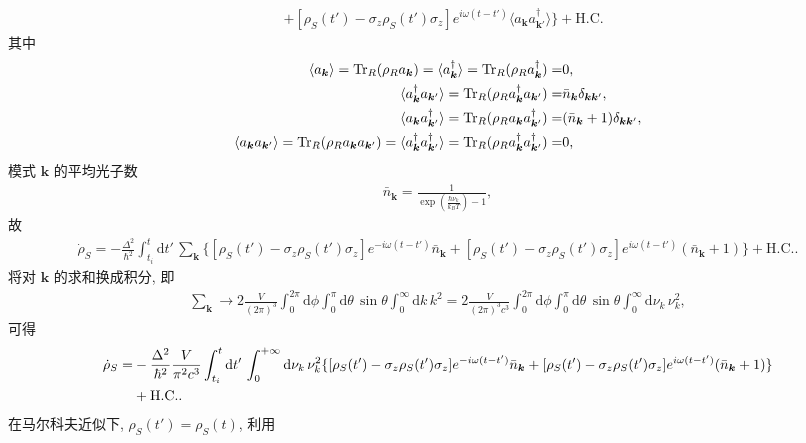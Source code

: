 \documentclass{assignment}
\begin{document}
\begin{sol}
\begin{align}
        &+[\rho_S(t')-\sigma_z\rho_S(t')\sigma_z]e^{i\omega(t-t')}\langle a_{\bm{k}}a_{\bm{k}'}^{\dagger}\rangle\}+\text{H.C.}
    \end{align}
    其中
    \begin{align}
        \langle a_{\bm{k}}\rangle=\operatorname{Tr}_R(\rho_Ra_{\bm{k}})=\langle a_{\bm{k}}^{\dagger}\rangle=\operatorname{Tr}_R(\rho_Ra_{\bm{k}}^{\dagger})=&0,\\
        \langle a_{\bm{k}}^{\dagger}a_{\bm{k}'}\rangle=\operatorname{Tr}_R(\rho_Ra_{\bm{k}}^{\dagger}a_{\bm{k}'})=&\bar{n}_{\bm{k}}\delta_{\bm{kk}'},\\
        \langle a_{\bm{k}}a_{\bm{k}'}^{\dagger}\rangle=\operatorname{Tr}_R(\rho_Ra_{\bm{k}}a_{\bm{k}'}^{\dagger})=&(\bar{n}_{\bm{k}}+1)\delta_{\bm{kk}'},\\
        \langle a_{\bm{k}}a_{\bm{k}'}\rangle=\operatorname{Tr}_R(\rho_Ra_{\bm{k}}a_{\bm{k}'})=\langle a_{\bm{k}}^{\dagger}a_{\bm{k}'}^{\dagger}\rangle=\operatorname{Tr}_R(\rho_Ra_{\bm{k}}^{\dagger}a_{\bm{k}'}^{\dagger})=&0,
    \end{align}
    模式 $\bm{k}$ 的平均光子数
    \begin{align}
        \bar{n}_{\bm{k}}=\frac{1}{\exp\left(\frac{\hbar\nu_k}{k_BT}\right)-1},
    \end{align}
    故
    \begin{align}
        \dot{\rho}_S=-\frac{\Delta^2}{\hbar^2}\int_{t_i}^t\mathrm{d}t'\,\sum_{\bm{k}}\{[\rho_S(t')-\sigma_z\rho_S(t')\sigma_z]e^{-i\omega(t-t')}\bar{n}_{\bm{k}}+[\rho_S(t')-\sigma_z\rho_S(t')\sigma_z]e^{i\omega(t-t')}(\bar{n}_{\bm{k}}+1)\}+\text{H.C.}.
    \end{align}
    将对 $\bm{k}$ 的求和换成积分, 即
    \begin{align}
        \sum_{\bm{k}}\rightarrow 2\frac{V}{(2\pi)^3}\int_0^{2\pi}\mathrm{d}\phi\int_0^{\pi}\mathrm{d}\theta\,\sin\theta\int_0^{\infty}\mathrm{d}k\,k^2=2\frac{V}{(2\pi)^3c^3}\int_0^{2\pi}\mathrm{d}\phi\int_0^{\pi}\mathrm{d}\theta\,\sin\theta\int_0^{\infty}\mathrm{d}\nu_k\,\nu_k^2,
    \end{align}
    可得
    \begin{align}
        \notag\dot{\rho}_S=&-\frac{\Delta^2}{\hbar^2}\frac{V}{\pi^2c^3}\int_{t_i}^t\mathrm{d}t'\,\int_0^{+\infty}\mathrm{d}\nu_k\,\nu_k^2\{[\rho_S(t')-\sigma_z\rho_S(t')\sigma_z]e^{-i\omega(t-t')}\bar{n}_{\bm{k}}+[\rho_S(t')-\sigma_z\rho_S(t')\sigma_z]e^{i\omega(t-t')}(\bar{n}_{\bm{k}}+1)\}\\
        &+\text{H.C.}.
    \end{align}
    在马尔科夫近似下, $\rho_S(t')=\rho_S(t)$, 利用
    \begin{align}

\end{align}
\end{sol}
\end{document}
